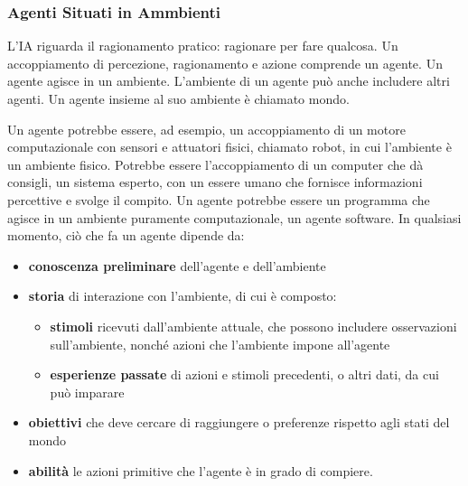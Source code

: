 \documentclass[a4paper]{extarticle}
\begin{document}
\subsubsection{Agenti Situati in Ammbienti}
L'IA riguarda il ragionamento pratico: ragionare per fare qualcosa. Un accoppiamento di percezione, ragionamento e azione comprende un agente. Un agente agisce in un ambiente. L'ambiente di un agente può anche includere altri agenti. Un agente insieme al suo ambiente è chiamato mondo.

Un agente potrebbe essere, ad esempio, un accoppiamento di un motore computazionale con sensori e attuatori fisici, chiamato robot, in cui l'ambiente è un ambiente fisico. Potrebbe essere l'accoppiamento di un computer che dà consigli, un sistema esperto, con un essere umano che fornisce informazioni percettive e svolge il compito. Un agente potrebbe essere un programma che agisce in un ambiente puramente computazionale, un agente software. In qualsiasi momento, ciò che fa un agente dipende da:
\begin{itemize}
\item \textbf{conoscenza preliminare} dell'agente e dell'ambiente
\item \textbf{storia} di interazione con l'ambiente, di cui è composto:
\begin{itemize}
\item \textbf{stimoli} ricevuti dall'ambiente attuale, che possono includere osservazioni sull'ambiente, nonché azioni che l'ambiente impone all'agente 
\item \textbf{esperienze passate} di azioni e stimoli precedenti, o altri dati, da cui può imparare
\end{itemize}
\item \textbf{obiettivi} che deve cercare di raggiungere o preferenze rispetto agli stati del mondo
\item \textbf{abilità} le azioni primitive che l'agente è in grado di compiere.
\end{itemize}
\end{document}
